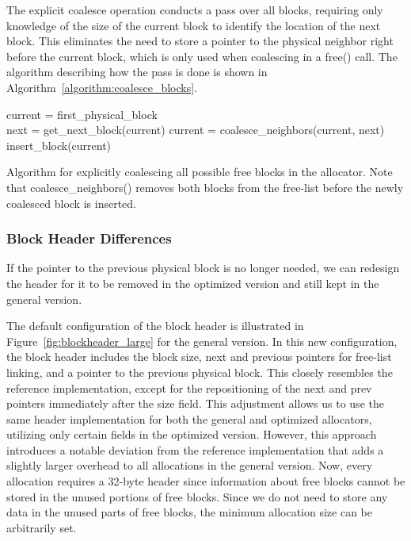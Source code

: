 The explicit coalesce operation conducts a pass over all blocks, requiring only knowledge of the size of the current block to identify the location of the next block. This eliminates the need to store a pointer to the physical neighbor right before the current block, which is only used when coalescing in a free() call. The algorithm describing how the pass is done is shown in Algorithm~\ref{algorithm:coalesce_blocks}.

\begin{algorithm}[H]
current = first\_physical\_block\\
 {
next = get\_next\_block(current)\;
 {
    current = coalesce\_neighbors(current, next)\;
    insert\_block(current)\;
}
}
\label{algorithm:coalesce_blocks}
\caption{Algorithm for explicitly coalescing all possible free blocks in the allocator. Note that coalesce\_neighbors() removes both blocks from the free-list before the newly coalesced block is inserted.}
\end{algorithm}

\subsubsection{Block Header Differences}

If the pointer to the previous physical block is no longer needed, we can redesign the header for it to be removed in the optimized version and still kept in the general version.

The default configuration of the block header is illustrated in Figure~\ref{fig:blockheader_large} for the general version. In this new configuration, the block header includes the block size, next and previous pointers for free-list linking, and a pointer to the previous physical block. This closely resembles the reference implementation, except for the repositioning of the next and prev pointers immediately after the size field. This adjustment allows us to use the same header implementation for both the general and optimized allocators, utilizing only certain fields in the optimized version. However, this approach introduces a notable deviation from the reference implementation that adds a slightly larger overhead to all allocations in the general version. Now, every allocation requires a 32-byte header since information about free blocks cannot be stored in the unused portions of free blocks. Since we do not need to store any data in the unused parts of free blocks, the minimum allocation size can be arbitrarily set.

